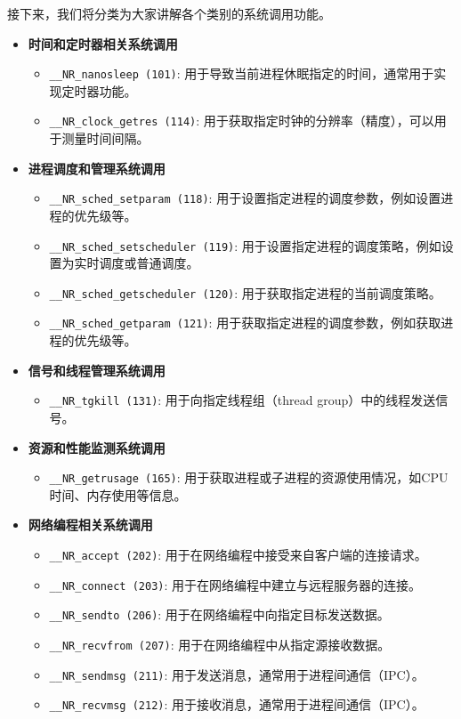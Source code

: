 接下来，我们将分类为大家讲解各个类别的系统调用功能。

\begin{itemize}
    \item \textbf{时间和定时器相关系统调用}
    \begin{itemize}
        \item \texttt{\_\_NR\_nanosleep (101)}: 用于导致当前进程休眠指定的时间，通常用于实现定时器功能。
        \item \texttt{\_\_NR\_clock\_getres (114)}: 用于获取指定时钟的分辨率（精度），可以用于测量时间间隔。
    \end{itemize}

    \item \textbf{进程调度和管理系统调用}
    \begin{itemize}
        \item \texttt{\_\_NR\_sched\_setparam (118)}: 用于设置指定进程的调度参数，例如设置进程的优先级等。
        \item \texttt{\_\_NR\_sched\_setscheduler (119)}: 用于设置指定进程的调度策略，例如设置为实时调度或普通调度。
        \item \texttt{\_\_NR\_sched\_getscheduler (120)}: 用于获取指定进程的当前调度策略。
        \item \texttt{\_\_NR\_sched\_getparam (121)}: 用于获取指定进程的调度参数，例如获取进程的优先级等。
    \end{itemize}

    \item \textbf{信号和线程管理系统调用}
    \begin{itemize}
        \item \texttt{\_\_NR\_tgkill (131)}: 用于向指定线程组（thread group）中的线程发送信号。
    \end{itemize}

    \item \textbf{资源和性能监测系统调用}
    \begin{itemize}
        \item \texttt{\_\_NR\_getrusage (165)}: 用于获取进程或子进程的资源使用情况，如CPU时间、内存使用等信息。
    \end{itemize}

    \item \textbf{网络编程相关系统调用}
    \begin{itemize}
        \item \texttt{\_\_NR\_accept (202)}: 用于在网络编程中接受来自客户端的连接请求。
        \item \texttt{\_\_NR\_connect (203)}: 用于在网络编程中建立与远程服务器的连接。
        \item \texttt{\_\_NR\_sendto (206)}: 用于在网络编程中向指定目标发送数据。
        \item \texttt{\_\_NR\_recvfrom (207)}: 用于在网络编程中从指定源接收数据。
        \item \texttt{\_\_NR\_sendmsg (211)}: 用于发送消息，通常用于进程间通信（IPC）。
        \item \texttt{\_\_NR\_recvmsg (212)}: 用于接收消息，通常用于进程间通信（IPC）。
    \end{itemize}


\end{itemize}
